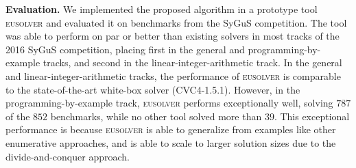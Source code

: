 \documentclass{llncs}
\newcommand\SynthFun{f}
\newcommand\ITE[3]{\mathtt{if}~#1~\mathtt{then}~#2~\mathtt{else}~#3}
\newcommand{\sygus}{{\sffamily\fontsize{8.5}{10}\selectfont
    SyGuS}\xspace}
\renewcommand{\paragraph}[1]{\par\noindent\textbf{#1.}}
\newcommand{\eusolver}{\textsc{eusolver}\xspace}
\begin{document}

\paragraph{Evaluation}
We implemented the proposed algorithm in a prototype tool \eusolver and
evaluated it on benchmarks from the \sygus competition.
The tool was able to perform on par or better than existing solvers in
most tracks of the 2016 \sygus competition, placing first in the general
and programming-by-example tracks, and second in the
linear-integer-arithmetic track.
In the general and linear-integer-arithmetic tracks, the performance of
\eusolver is comparable to the state-of-the-art white-box solver
(CVC4-1.5.1).
However, in the programming-by-example track, \eusolver performs
exceptionally well, solving $787$ of the $852$ benchmarks, while no
other tool solved more than $39$.
This exceptional performance is because \eusolver is able to
generalize from examples like other enumerative approaches, and is
able to scale to larger solution sizes due to the divide-and-conquer
approach.
\end{document}
